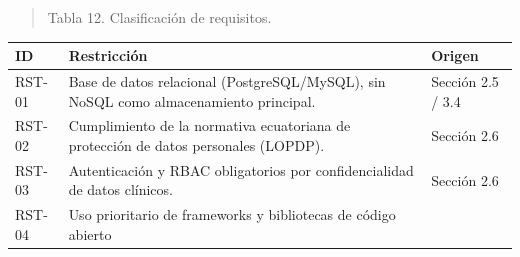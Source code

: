 \documentclass[
]{article}
\newcounter{none} %
\begin{document}
\begin{quote}
\protect{}\label{table12}{}Tabla 12. Clasificación de
requisitos.
\end{quote}

{\def\LTcaptype{none} %
\begin{longtable}[]{@{}
  >{\raggedright\arraybackslash}p{}
  >{\raggedright\arraybackslash}p{}
  >{\raggedright\arraybackslash}p{}@{}}
\toprule\noalign{}
\begin{minipage}[b]{\linewidth}\centering
\textbf{ID}
\end{minipage} & \begin{minipage}[b]{\linewidth}\centering
\textbf{Restricción}
\end{minipage} & \begin{minipage}[b]{\linewidth}\raggedright
\textbf{Origen}
\end{minipage} \\
\midrule\noalign{}
\endhead
\bottomrule\noalign{}
\endlastfoot
RST-01 & \begin{minipage}[t]{\linewidth}\raggedright
Base de datos relacional (PostgreSQL/MySQL), sin NoSQL como
almacenamiento principal.
\end{minipage} & \begin{minipage}[t]{\linewidth}\raggedright
Sección 2.5 / 3.4
\end{minipage} \\
RST-02 & \begin{minipage}[t]{\linewidth}\raggedright
Cumplimiento de la normativa ecuatoriana de protección de datos
personales (LOPDP).
\end{minipage} & \begin{minipage}[t]{\linewidth}\raggedright
Sección 2.6
\end{minipage} \\
RST-03 & \begin{minipage}[t]{\linewidth}\raggedright
Autenticación y RBAC obligatorios por confidencialidad de datos
clínicos.
\end{minipage} & \begin{minipage}[t]{\linewidth}\raggedright
Sección 2.6
\end{minipage} \\
RST-04 & \begin{minipage}[t]{\linewidth}\raggedright
Uso prioritario de frameworks y bibliotecas de código abierto

\end{minipage}
\end{longtable}}
\end{document}
